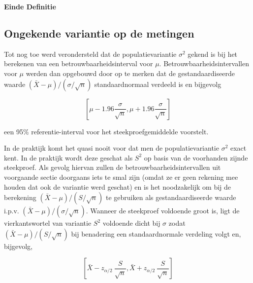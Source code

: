 \documentclass[
  12pt,dutch]{book}
\theoremstyle{definition}
\theoremstyle{definition}
\theoremstyle{definition}
\theoremstyle{definition}
\theoremstyle{remark}
\begin{document}
\textbf{Einde Definitie}

\subsection{Ongekende variantie op de metingen}\label{sec:tBI}

Tot nog toe werd verondersteld dat de populatievariantie \(\sigma^2\) gekend is bij het berekenen van een betrouwbaarheidsinterval voor \(\mu\).
Betrouwbaarheidsintervallen voor \(\mu\) werden dan opgebouwd door op te
merken dat de gestandaardiseerde waarde \((\bar{X} - \mu)/(\sigma/\sqrt{n})\)
standaardnormaal verdeeld is en bijgevolg

\begin{equation*}
\left[\mu - 1.96 \frac{\sigma}{\sqrt{n}},\mu + 1.96 \frac{\sigma}{\sqrt{n}}%
\right]
\end{equation*}

een 95\% referentie-interval voor het steekproefgemiddelde voorstelt.

In de praktijk komt het quasi nooit voor dat men de populatievariantie \(\sigma^2\) exact kent. In de praktijk wordt deze geschat als \(S^2\) op basis van de voorhanden zijnde steekproef. Als gevolg hiervan zullen de betrouwbaarheidsintervallen uit voorgaande sectie doorgaans iets te smal zijn (omdat ze er geen rekening mee houden dat ook de variantie werd geschat) en is het
noodzakelijk om bij de berekening \((\bar{X} - \mu)/(S/\sqrt{n})\) te
gebruiken als gestandaardiseerde waarde i.p.v. \((\bar{X} - \mu)/(\sigma/\sqrt{n})\). Wanneer de steekproef voldoende groot is, ligt de vierkantswortel van variantie \(S^2\) voldoende dicht bij \(\sigma\) zodat \({(\bar{X} - \mu)}/{(S/\sqrt{n}) }\) bij benadering een standaardnormale verdeling volgt en, bijgevolg,

\[
\left[\bar{X} - z_{\alpha/2} \ \frac{S}{\sqrt{n}} , \bar{X} + z_{\alpha/2} \
\frac{S}{\sqrt{n}}\right]
\]
\end{document}

